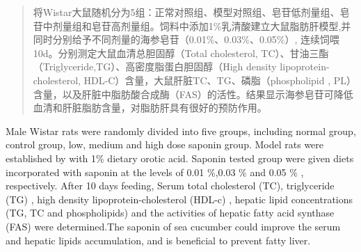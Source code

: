 %
%
\thispagestyle{empty}
\begin{abstract}

将Wistar大鼠随机分为5组：正常对照组、模型对照组、皂苷低剂量组、皂苷中剂量组和皂苷高剂量组。饲料中添加1\%乳清酸建立大鼠脂肪肝模型,并同时分别给予不同剂量的海参皂苷（0.01\%、0.03\%、0.05\%）, 连续饲喂10d。分别测定大鼠血清总胆固醇（Total cholesterol, TC）、甘油三酯（Triglyceride,TG）、高密度脂蛋白胆固醇（High density lipoprotein-cholesterol, HDL-C）含量，大鼠肝脏TC、TG、磷脂（phospholipid , PL）含量，以及肝脏中脂肪酸合成酶（FAS）的活性。结果显示海参皂苷可降低血清和肝脏脂肪含量，对脂肪肝具有很好的预防作用。

\end{abstract}

\begin{englishabstract}

Male Wistar rats were randomly divided into five groups, including normal group, control group, low, medium and high dose saponin group. Model rats were established by with 1\% dietary orotic acid. Saponin tested group were given diets incorporated with saponin at the levels of 0.01 \%,0.03 \% and 0.05 \% , respectively. After 10 days feeding, Serum total cholesterol (TC), triglyceride (TG) , high density lipoprotein-cholesterol (HDL-c) , hepatic lipid concentrations (TG, TC and phospholipids) and the activities of hepatic fatty acid synthase (FAS) were determined.The saponin of sea cucumber could improve the serum and hepatic lipids accumulation, and is beneficial to prevent fatty liver.

\end{englishabstract}



